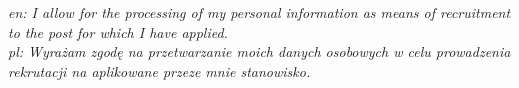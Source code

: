 \documentclass[8pt]{developercv} %
\begin{document}

\vspace{22pt}

\centering\begin{minipage}{0.8\linewidth}
  \centering\textit{
    en: I allow for the processing of my personal information as means of recruitment to the post for which I have applied.\\
    pl: Wyrażam zgodę na przetwarzanie moich danych osobowych w celu prowadzenia rekrutacji na aplikowane przeze mnie stanowisko.
  }
\end{minipage}
\end{document}

